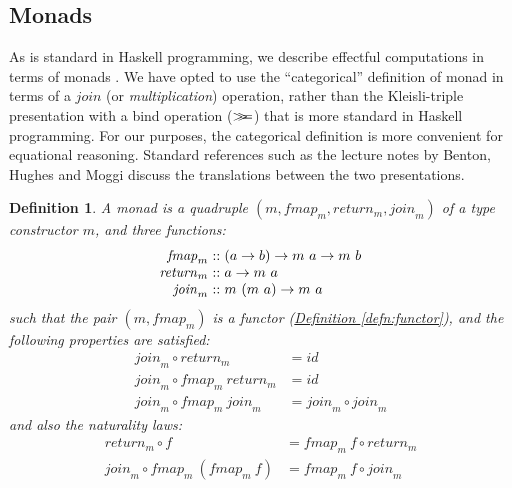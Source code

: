 \documentclass{jfp1}
\newcommand{\mbind}{\mathrel{>\kern-0.45em>\kern-0.45em=}}
\newtheorem{definition}{Definition}
\newcommand{\defref}[1]{\hyperref[#1]{Definition \ref*{#1}}}
\begin{document}
\subsection{Monads}

As is standard in Haskell programming, we describe effectful
computations in terms of monads \cite{moggi91notions,
  peytonjones93imperative}. We have opted to use the ``categorical''
definition of monad in terms of a $\mathit{join}$ (or
\emph{multiplication}) operation, rather than the Kleisli-triple
presentation with a bind operation ($\mbind$) that is more standard in
Haskell programming. For our purposes, the categorical definition is
more convenient for equational reasoning. Standard references such as
the lecture notes by Benton, Hughes and Moggi \cite{benton00monads}
discuss the translations between the two presentations.

\begin{definition}\label{defn:monad}
  A monad is a quadruple $(m, \mathit{fmap}_m, \mathit{return}_m,
  \mathit{join}_m)$ of a type constructor $m$, and three functions:
  \begin{displaymath}
    \begin{array}{r@{\hspace{0.3em}}c@{\hspace{0.3em}}l}
      \mathit{fmap}_m   & :: & (a \to b) \to m~a \to m~b \\
      \mathit{return}_m & :: & a \to m~a \\
      \mathit{join}_m   & :: & m~(m~a) \to m~a
    \end{array}
  \end{displaymath}
  such that the pair $(m, \mathit{fmap}_m)$ is a functor
  (\defref{defn:functor}), and the following properties are satisfied:
  \begin{align}
    \label{eq:monad-join-return}
    \mathit{join}_m \circ \mathit{return}_m & = \mathit{id} \\
    \label{eq:monad-join-fmap-return}
    \mathit{join}_m \circ \mathit{fmap}_m~\mathit{return}_m & = \mathit{id} \\
    \label{eq:monad-join-join}
    \mathit{join}_m \circ \mathit{fmap}_m~\mathit{join}_m & = \mathit{join}_m \circ \mathit{join}_m
  \end{align}
  and also the naturality laws:
  \begin{align}
    \label{eq:monad-return-natural}
    \mathit{return}_m \circ f & = \mathit{fmap}_m~f \circ \mathit{return}_m \\
    \label{eq:monad-join-natural}
    \mathit{join}_m \circ \mathit{fmap}_m~(\mathit{fmap}_m~f) & = \mathit{fmap}_m~f \circ \mathit{join}_m
  \end{align}
\end{definition}
\end{document}
